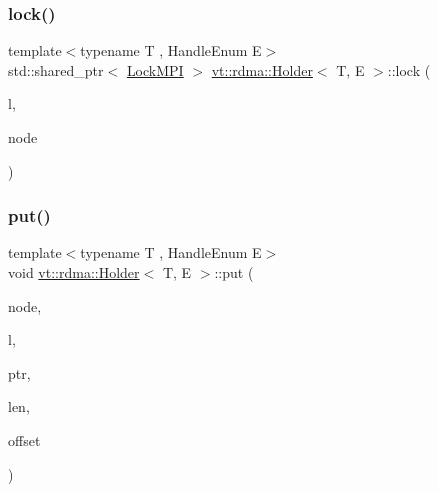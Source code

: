 \subsubsection{\texorpdfstring{lock()}{lock()}}
{\footnotesize\ttfamily template$<$typename T , Handle\+Enum E$>$ \\
std\+::shared\+\_\+ptr$<$ \hyperlink{structvt_1_1rdma_1_1_lock_m_p_i}{Lock\+M\+PI} $>$ \hyperlink{structvt_1_1rdma_1_1_holder}{vt\+::rdma\+::\+Holder}$<$ T, E $>$\+::lock (\begin{DoxyParamCaption}\item[{\hyperlink{namespacevt_1_1rdma_ac5c20b41a653e520b6305d4d454ecb70}{Lock}}]{l,  }\item[{\hyperlink{namespacevt_a866da9d0efc19c0a1ce79e9e492f47e2}{vt\+::\+Node\+Type}}]{node }\end{DoxyParamCaption})}

\mbox{\label{structvt_1_1rdma_1_1_holder_ad6edaae632bb4025e8d29f27abfcf81c}} 
\subsubsection{\texorpdfstring{put()}{put()}}
{\footnotesize\ttfamily template$<$typename T , Handle\+Enum E$>$ \\
void \hyperlink{structvt_1_1rdma_1_1_holder}{vt\+::rdma\+::\+Holder}$<$ T, E $>$\+::put (\begin{DoxyParamCaption}\item[{\hyperlink{namespacevt_a866da9d0efc19c0a1ce79e9e492f47e2}{vt\+::\+Node\+Type}}]{node,  }\item[{\hyperlink{namespacevt_1_1rdma_ac5c20b41a653e520b6305d4d454ecb70}{Lock}}]{l,  }\item[{T $\ast$}]{ptr,  }\item[{std\+::size\+\_\+t}]{len,  }\item[{int}]{offset }\end{DoxyParamCaption})}

\mbox{\label{structvt_1_1rdma_1_1_holder_a1d1abbaaad0d2490b01b10493fe78e36}} 
